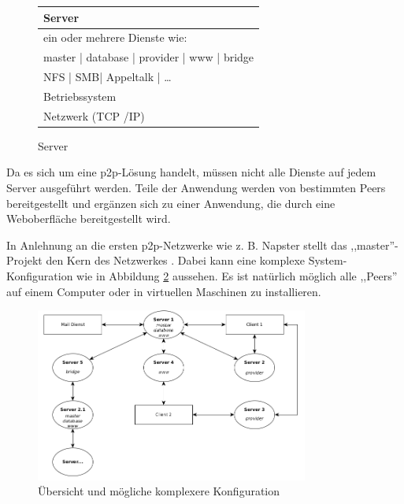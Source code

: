 \documentclass[oneside, ngerman, toc=bibliography,bibliography=totoc,listof=entryprefix, open=right,numbers=noenddot,fontsize=12pt]{scrbook}
\begin{document}
 \begin{figure}[htbp] 
     \centering 
     \begin{tabular}{|p{}|}
         \hline
         Server\\ \hline\hline
         ein oder mehrere Dienste wie:\\
         master  | database | provider | www | bridge\\ \hline\hline
         NFS | SMB| Appeltalk | \ldots \\ \hline
         Betriebssystem \\ \hline
         Netzwerk (TCP /IP) \\ \hline
        \end{tabular}
        
        \caption{Server}
        \label{fig:xist-server}
        
    \end{figure}   
    
 
Da es sich um eine \acrshort{p2p}-Lösung handelt, müssen nicht alle Dienste auf jedem Server ausgeführt werden. 
Teile der Anwendung werden von bestimmten Peers bereitgestellt und ergänzen sich zu einer Anwendung, die durch eine Weboberfläche bereitgestellt wird.


In Anlehnung an die ersten \acrshort{p2p}-Netzwerke wie z. B. Napster stellt das ,,master''-Projekt den Kern des Netzwerkes \cite{mahlmann2007peer}.
Dabei kann eine komplexe System-Konfiguration wie in Abbildung \ref{fig:app-outline} aussehen. Es ist natürlich möglich alle ,,Peers'' auf einem Computer oder in virtuellen Maschinen zu installieren.

\begin{figure}[htbp] 
    \centering
    \includegraphics[width=0.8\textwidth]{Masterarbeit_Bilder/clients_uebersicht.png}
    \caption{Übersicht und mögliche komplexere Konfiguration}
    \label{fig:app-outline}
\end{figure}  
\end{document}
